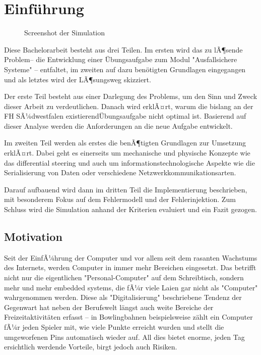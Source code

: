 \clearpage
\section{Einf{\"{u}}hrung}
\begin{figure}
	\centering
	\caption{Screenshot der Simulation}
	\label{fig:simulation}
\end{figure}

Diese Bachelorarbeit besteht aus drei Teilen. Im ersten wird das zu lÃ¶sende Problem-- die Entwicklung einer 
{\"{U}}bungsaufgabe zum Modul "Ausfallsichere Systeme" -- entfaltet, im zweiten auf dazu ben{\"{o}}tigten
Grundlagen eingegangen und als letztes wird der LÃ¶sungsweg skizziert. 

Der erste Teil besteht aus einer Darlegung des Problems, um den Sinn und Zweck dieser Arbeit zu verdeutlichen. 
Danach wird erklÃ¤rt, warum die bislang an der FH SÃ¼dwestfalen existierend{\"{U}}bungsaufgabe nicht optimal ist. 
Basierend auf dieser Analyse werden die Anforderungen an die neue Aufgabe entwickelt. 

Im zweiten Teil werden als erstes die benÃ¶tigten Grundlagen zur Umsetzung erklÃ¤rt. Dabei geht es einerseits um 
mechanische und physische Konzepte wie das differential steering und auch um informationstechnologische Aspekte
wie die Serialisierung von Daten oder verschiedene Netzwerkkommunikationsarten.

Darauf aufbauend wird dann im dritten Teil die Implementierung beschrieben, mit besonderem Fokus auf dem 
Fehlermodell und der Fehlerinjektion. Zum Schluss wird die Simulation anhand der Kriterien evaluiert und ein Fazit 
gezogen.

\subsection{Motivation}
Seit der EinfÃ¼hrung der Computer und vor allem seit dem rasanten Wachstums des Internets, werden Computer in immer 
mehr Bereichen eingesetzt. Das betrifft nicht nur die eigentlichen "Personal-Computer" auf dem Schreibtisch, 
sondern mehr und mehr embedded systems, die fÃ¼r viele Laien gar nicht als "Computer" wahrgenommen werden. Diese 
als "Digitalisierung" beschriebene Tendenz der Gegenwart hat neben der Berufswelt l{\"{a}}ngst auch weite Bereiche 
der Freizeitaktivit{\"{a}}ten erfasst -- in Bowlingbahnen beispielsweise z{\"{a}}hlt ein Computer fÃ¼r jeden 
Spieler mit, wie viele Punkte erreicht wurden und stellt die umgeworfenen Pins automatisch wieder auf. All dies 
bietet enorme, jeden Tag ersichtlich werdende Vorteile, birgt jedoch auch Risiken. 


